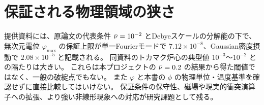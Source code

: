 \section{保証される物理領域の狭さ}
提供資料には、原論文の代表条件 $\bar\nu=10^{-2}$ とDebyeスケールの分解能の下で、
無次元電位 $\varphi_{\max}$ の保証上限が単一Fourierモードで $7.12\times10^{-8}$、Gaussian密度摂動で $2.08\times10^{-5}$ と記載される。
同資料のトカマク炉心の典型値 $10^{-3}$〜$10^{-2}$ との隔たりは大きい。
これらは本プロジェクトの $\bar\nu=0.2$ の結果から得た閾値ではなく、一般の破綻点でもない。
また $\varphi$ と本書の $\phi$ の物理単位・温度基準を確認せずに直接比較してはいけない。
保証条件の保守性、磁場や現実的衝突演算子への拡張、より強い非線形現象への対応が研究課題として残る。

